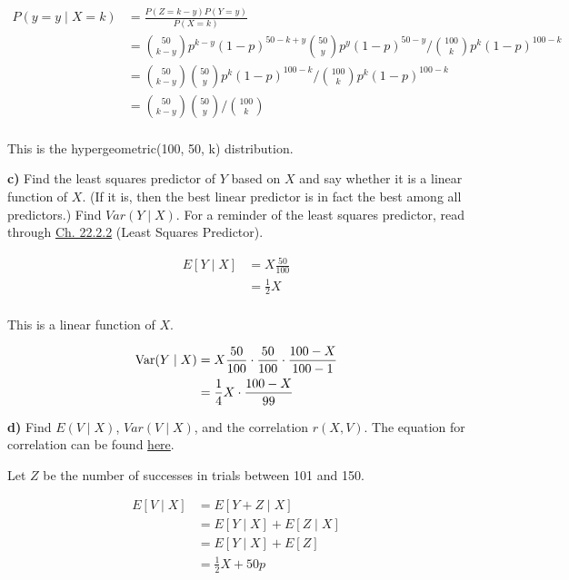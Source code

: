 \documentclass[11pt]{article}
\begin{document}
\begin{align*}
	P(y=y \mid X=k) &= \frac{P(Z = k-y) P(Y=y)}{P(X=k)} \\
	&= \binom{50}{k-y} p^{k-y}(1-p)^{50-k+y} \binom{50}{y}p^{y} (1-p)^{50-y} / \binom{100}{k}p^{k} (1-p)^{100-k}\\
	&= \binom{50}{k-y} \binom{50}{y} p^{k} (1-p)^{100-k} / \binom{100}{k}p^{k} (1-p)^{100-k}\\
	&= \binom{50}{k-y} \binom{50}{y} / \binom{100}{k} \\
\end{align*}

This is the hypergeometric(100, 50, k)  distribution.


\textbf{c)} Find the least squares predictor of \(Y\) based on \(X\) and
say whether it is a linear function of \(X\). (If it is, then the best
linear predictor is in fact the best among all predictors.) Find
\(Var(Y \mid X)\). For a reminder of the least squares predictor, read
through
\href{https://data140.org/textbook/content/chapter-22/least-squares-predictor/\#best-predictor}{Ch.
22.2.2} (Least Squares Predictor).


\begin{align*}
	E[Y \mid X] &= X \frac{50}{100} \\
	&= \frac{1}{2}X \\
\end{align*}

This is a linear function of $X$. 


\begin{align*}
	\operatorname{Var}(Y \mid X) &= X \frac{50}{100} \cdot \frac{50}{100} \cdot \frac{100-X}{100-1} \\
	&= \frac{1}{4} X \cdot \frac{100-X}{99} \\
\end{align*}



\textbf{d)} Find \(E(V \mid X)\), \(Var(V \mid X)\), and the correlation
\(r(X, V)\). The equation for correlation can be found
\href{https://data140.org/textbook/content/chapter-13/covariance/\#correlation}{here}.

Let $Z$  be the number of successes in trials between 101 and 150.


\begin{align*}
	E[V \mid X] &= E[Y + Z \mid X] \\
	&= E[Y \mid X] + E[Z \mid X]	\\
	&= E[Y \mid X]  + E[Z] \\
	&= \frac{1}{2}X + 50p \\
\end{align*}
\end{document}
